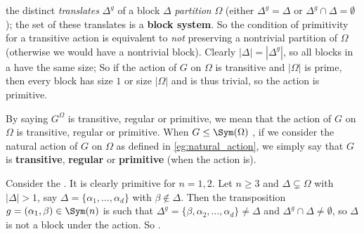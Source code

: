  the distinct \textit{translates} $\Delta^g$ of a block $\Delta$ \textit{partition} $\Omega$ (either $\Delta^g = \Delta$ or $\Delta^g \cap \Delta = \emptyset$); the set  of these translates  is a \textbf{block system}. So the condition of primitivity for a transitive action is equivalent to \textit{not} preserving a nontrivial partition of $\Omega$ (otherwise we would have a nontrivial block). Clearly $|\Delta| = |\Delta^g|$, so all blocks in a  have the same size;  So if the action of $G$ on $\Omega$ is transitive and $|\Omega|$ is prime, then every block has size $1$ or size $|\Omega|$ and is thus trivial, so the action is primitive. 

By saying $G^\Omega$ is transitive, regular or primitive, we mean that the action of $G$ on $\Omega$ is transitive, regular or primitive. When $G \leq \Sym(\Omega)$ , if we consider the natural action of $G$ on $\Omega$ as defined in \autoref{eg:natural_action}, we simply say that $G$ is \textbf{transitive}, \textbf{regular} or \textbf{primitive} (when the action is).


\begin{example}\label{eg:natural_action_Sn_blocks}
    Consider the . It is clearly primitive for $n = 1,2$. Let $n \geq 3$ and $\Delta \subsetneq \Omega$ with $|\Delta| > 1$, say $\Delta = \{\alpha_1,\dotsc,\alpha_d\}$ with $\beta \not\in \Delta$. Then the transposition $g = (\alpha_1,\beta) \in \Sym(n)$ is such that $\Delta^g = \{\beta,\alpha_2,\dotsc,\alpha_d\} \neq \Delta$ and $\Delta^g \cap \Delta \neq \emptyset$, so $\Delta$ is not a block under the action. So .
\end{example}


